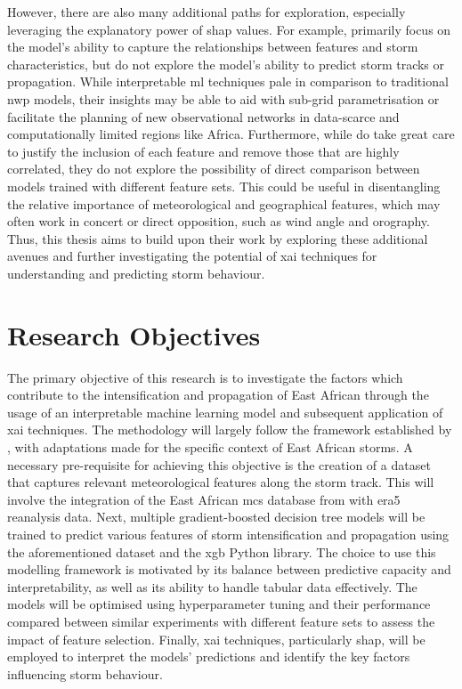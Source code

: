 However, there are also many additional paths for exploration, especially leveraging the explanatory power of \acrshort{shap} values. For example, \cite{Hunt2024} primarily focus on the model's ability to capture the relationships between features and storm characteristics, but do not explore the model's ability to predict storm tracks or propagation. While interpretable \acrshort{ml} techniques pale in comparison to traditional \acrshort{nwp} models, their insights may be able to aid with sub-grid parametrisation or facilitate the planning of new observational networks in data-scarce and computationally limited regions like Africa. Furthermore, while \cite{Hunt2024} do take great care to justify the inclusion of each feature and remove those that are highly correlated, they do not explore the possibility of direct comparison between models trained with different feature sets. This could be useful in disentangling the relative importance of meteorological and geographical features, which may often work in concert or direct opposition, such as wind angle and orography. Thus, this thesis aims to build upon their work by exploring these additional avenues and further investigating the potential of \acrshort{xai} techniques for understanding and predicting storm behaviour.

\section{Research Objectives}

The primary objective of this research is to investigate the factors which contribute to the intensification and propagation of East African  through the usage of an interpretable machine learning model and subsequent application of \acrshort{xai} techniques. The methodology will largely follow the framework established by \cite{Hunt2024}, with adaptations made for the specific context of East African storms. A necessary pre-requisite for achieving this objective is the creation of a dataset that captures relevant meteorological features along the storm track. This will involve the integration of the East African \acrshort{mcs} database from \cite{Hill2023} with \acrshort{era5} reanalysis data. Next, multiple gradient-boosted decision tree models will be trained to predict various features of storm intensification and propagation using the aforementioned dataset and the \acrfull{xgb} Python library. The choice to use this modelling framework is motivated by its balance between predictive capacity and interpretability, as well as its ability to handle tabular data effectively. The models will be optimised using hyperparameter tuning and their performance compared between similar experiments with different feature sets to assess the impact of feature selection. Finally, \acrshort{xai} techniques, particularly \acrshort{shap}, will be employed to interpret the models' predictions and identify the key factors influencing storm behaviour.

